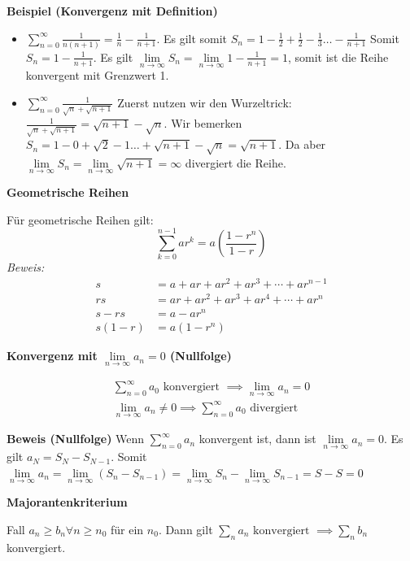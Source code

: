 \documentclass[25pt]{sciposter}
\newcommand{\limm}{\lim\limits_{n \to \infty}}
\newenvironment{method}[1]{\begin{mdframed}[backgroundcolor=blue!10,innertopmargin=15pt, innerbottommargin=15pt, nobreak=true]
		\textbf{#1 }
	}
	{ 
	\end{mdframed}
}
\begin{document}
\begin{multicols}{3}
\textbf{Beispiel (Konvergenz mit Definition)}
\begin{itemize}
	\item $\sum_{n = 0}^{\infty} \frac{1}{n(n+1)} = \frac{1}{n} - \frac{1}{n+1}$. Es gilt somit $S_n = 1 - \frac{1}{2} + \frac{1}{2} - \frac{1}{3} \ldots - \frac{1}{n+1}$ Somit $S_n = 1-\frac{1}{n+1}$. Es gilt $\limm S_n = \limm 1 - \frac{1}{n+1} = 1$, somit ist die Reihe konvergent mit Grenzwert 1.
	\item $\sum_{n = 0}^{\infty} \frac{1}{\sqrt{n} + \sqrt{n+1}} $ Zuerst nutzen wir den Wurzeltrick: $\frac{1}{\sqrt{n} + \sqrt{n+1}} = \sqrt{n+1} - \sqrt{n}$. Wir bemerken $S_n = 1 - 0 + \sqrt{2} - 1 \ldots + \sqrt{n+1} - \sqrt{n} = \sqrt{n+1}$. Da aber $\limm S_n =  \limm \sqrt{n+1} = \infty$ divergiert die Reihe.
\end{itemize}

\begin{method}{Geometrische Reihen}
	Für geometrische Reihen gilt:
	$$\sum _{k=0}^{n-1}ar^{k}=a\left({\frac {1-r^{n}}{1-r}}\right)$$
	\textit{Beweis:}
	\begin{align*}
	s&=a+ar+ar^{2}+ar^{3}+\cdots +ar^{n-1}\\
	rs&=ar+ar^{2}+ar^{3}+ar^{4}+\cdots +ar^{n}\\
	s-rs&=a-ar^{n}\\
	s(1-r)&=a(1-r^{n})
	\end{align*}
\end{method}

\begin{method}{Konvergenz mit $\lim\limits_{n \to \infty } a_n = 0$ (Nullfolge)}

\begin{align*}
\sum_{n=0}^{\infty} a_0 \text{ konvergiert } \implies \lim\limits_{n \to \infty } a_n = 0\\
\lim\limits_{n \to \infty } a_n \not = 0 \implies \sum_{n=0}^{\infty} a_0 \text{ divergiert }
\end{align*}
\end{method}

\textbf{Beweis (Nullfolge)} Wenn $\sum_{n = 0}^{\infty} a_n$ konvergent ist, dann ist $\limm a_n = 0$.
Es gilt $a_N = S_N - S_{N-1}$. Somit $\limm a_n = \limm (S_n - S_{n-1}) = \limm S_n - \limm S_{n-1} = S-S = 0$

\begin{method}{Majorantenkriterium}
	Fall $a_n \geq b_n \forall n \geq n_0$ für ein $n_0$. Dann gilt $\sum_n a_n \text{ konvergiert } \implies \sum_{n} b_n$ konvergiert.
\end{method}


\end{multicols}
\end{document}

